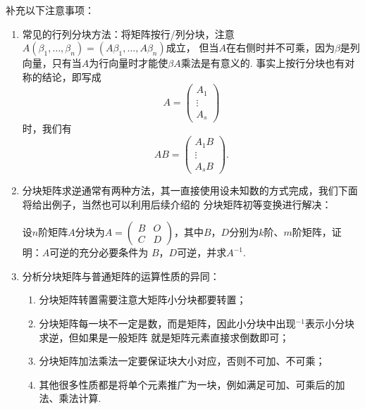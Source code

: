补充以下注意事项：
\begin{enumerate}
    \item 常见的行列分块方法：将矩阵按行/列分块，注意$A(\beta_1,\ldots,\beta_n)=(A\beta_1,\ldots,A\beta_n)$成立，
    但当$A$在右侧时并不可乘，因为$\beta$是列向量，只有当$A$为行向量时才能使$\beta A$乘法是有意义的.
    事实上按行分块也有对称的结论，即写成
    \[A=\begin{pmatrix}
        A_1 \\ \vdots \\ A_s
    \end{pmatrix}\]
    时，我们有
    \[AB=\begin{pmatrix}
        A_1B \\ \vdots \\ A_sB
    \end{pmatrix}.\]

    \item 分块矩阵求逆通常有两种方法，其一直接使用设未知数的方式完成，我们下面将给出例子，当然也可以利用后续介绍的
    分块矩阵初等变换进行解决：
    \begin{example}
        设$n$阶矩阵$A$分块为$A=\begin{pmatrix}
            B & O \\ C & D
        \end{pmatrix}$，其中$B$，$D$分别为$k$阶、$m$阶矩阵，证明：$A$可逆的充分必要条件为
        $B$，$D$可逆，并求$A^{-1}$.
    \end{example}
    \begin{solution}

    \end{solution}

    \item 分析分块矩阵与普通矩阵的运算性质的异同：
    \begin{enumerate}
        \item 分块矩阵转置需要注意大矩阵小分块都要转置；
        \item 分块矩阵每一块不一定是数，而是矩阵，因此小分块中出现$^{-1}$表示小分块求逆，但如果是一般矩阵
        就是矩阵元素直接求倒数即可；
        \item 分块矩阵加法乘法一定要保证块大小对应，否则不可加、不可乘；
        \item 其他很多性质都是将单个元素推广为一块，例如满足可加、可乘后的加法、乘法计算.
    \end{enumerate}
\end{enumerate}

